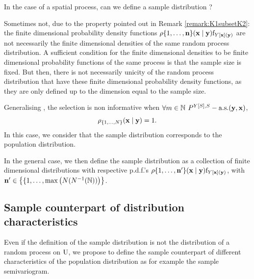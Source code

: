 In the case of a spatial process, can we define a sample distribution ?

Sometimes not, due to the property pointed out in Remark \ref{remark:K1subsetK2}:
the finite dimensional probability density functions 
$\rho{\{1,\ldots,\mathbf{n}\}}(\mathbf{x}\mid\mathbf{y})\mathrm{f}_{Y[\mathbf{x}](\mathbf{y})}$ are not necessarily the finite dimensional densities of the same random process distribution.
A sufficient condition for the finite dimensional densities to be finite dimensional probability functions of the same process is that the sample size is fixed.
But then, there is not necessarily unicity of the random process distribution that have these finite dimensional probability density functions, as they are only defined up to the dimension equal to the sample size.



Generalising \cite{pfefferman_1992}, the selection is non informative when $\forall m\in\mathbb{N}$ $P^{Y[S],S}-\text{a.s.}(\mathbf{y},\mathbf{x})$, $$\rho_{\{1,\ldots,N\}}(\mathbf{x}\mid\mathbf{y})=1.$$ In this case, we consider that the sample distribution corresponds to the population distribution.


In the general case, we then define the sample distribution as a
collection of finite dimensional distributions with respective p.d.f.'s
$\rho{\{1,\ldots,\mathbf{n}'\}}(\mathbf{x}\mid\mathbf{y})\mathrm{f}_{Y[\mathbf{x}](\mathbf{y})}$, with\\ $\mathbf{n}'\in\left\{\{1,\ldots,\max\left(N(N^{-1}(\mathbb{N}))\right)\right\}$. 



\subsection{Sample counterpart of distribution characteristics}

Even if the definition of the sample distribution is not the distribution of a random process on $\mathrm{U}$, we propose to define the sample counterpart of different characteristics of the population distribution as for example %
the sample semivariogram.


